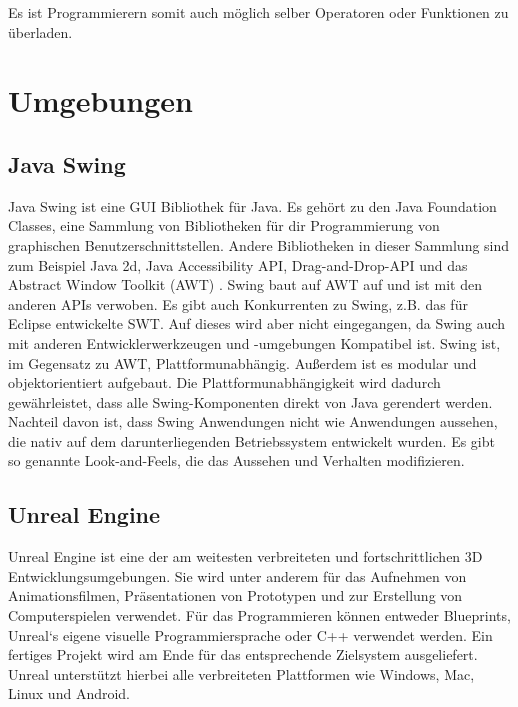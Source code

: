 \documentclass[
	12pt, %
	a4paper,
	listof=totoc, %
	bibliography=totoc, %
	numbers=noenddot, %
	ngerman, %
	headsepline, %
	oneside %
	]{scrbook} %
\begin{document}
Es ist Programmierern somit auch möglich selber Operatoren oder Funktionen zu überladen.

\chapter{Umgebungen}\label{sec:Umgebungen}
\section{Java Swing}
Java Swing ist eine \gls{GUI} Bibliothek für Java. Es gehört zu den Java Foundation Classes, eine Sammlung von Bibliotheken für dir Programmierung von graphischen Benutzerschnittstellen. Andere Bibliotheken in dieser Sammlung sind zum Beispiel Java 2d, Java Accessibility API, Drag-and-Drop-API und das Abstract Window Toolkit (AWT) \cite{JFC}. Swing baut auf AWT auf und ist mit den anderen APIs verwoben.  
Es gibt auch Konkurrenten zu Swing, z.B. das für Eclipse entwickelte SWT. Auf dieses wird aber nicht eingegangen, da Swing auch mit anderen Entwicklerwerkzeugen und -umgebungen Kompatibel ist.  
Swing ist, im Gegensatz zu AWT, Plattformunabhängig. Außerdem ist es modular und objektorientiert aufgebaut. Die Plattformunabhängigkeit wird dadurch gewährleistet, dass alle Swing-Komponenten direkt von Java gerendert werden. Nachteil davon ist, dass Swing Anwendungen nicht wie Anwendungen aussehen, die nativ auf dem darunterliegenden Betriebssystem entwickelt wurden.  
Es gibt so genannte \glqq Look-and-Feels\grqq{}, die das Aussehen und Verhalten modifizieren.

\section{Unreal Engine}

Unreal Engine ist eine der am weitesten verbreiteten und fortschrittlichen 3D Entwicklungsumgebungen. Sie wird unter anderem für das Aufnehmen von Animationsfilmen, Präsentationen von Prototypen und zur Erstellung von Computerspielen verwendet.
Für das Programmieren können entweder Blueprints, Unreal`s eigene visuelle Programmiersprache oder C++ verwendet werden. Ein fertiges Projekt wird am Ende für das entsprechende Zielsystem ausgeliefert. Unreal unterstützt hierbei alle verbreiteten Plattformen wie Windows, Mac, Linux und Android.
\end{document}
